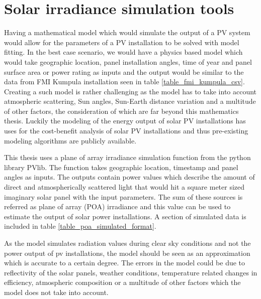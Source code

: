 \chapter{Solar irradiance simulation tools}
Having a mathematical model which would simulate the output of a PV system would allow for the parameters of a PV installation to be solved with model fitting. In the best case scenario, we would have a physics based model which would take geographic location, panel installation angles, time of year and panel surface area or power rating as inputs and the output would be similar to the data from FMI Kumpula installation seen in table \ref{table_fmi_kumpula_csv}. Creating a such model is rather challenging as the model has to take into account atmospheric scattering, Sun angles, Sun-Earth distance variation and a multitude of other factors, the consideration of which are far beyond this mathematics thesis. Luckily the modeling of the energy output of solar PV installations has uses for the cost-benefit analysis of solar PV installations and thus pre-existing modeling algorithms are publicly available. 



This thesis uses a plane of array irradiance simulation function from the python library PVlib. The function takes geographic location, timestamp and panel angles as inputs. The outputs contain power values which describe the amount of direct and atmospherically scattered light that would hit a square meter sized imaginary solar panel with the input parameters. The sum of these sources is referred as plane of array (POA) irradiance and this value can be used to estimate the output of solar power installations. A section of simulated data is included in table \ref{table_poa_simulated_format}.

As the model simulates radiation values during clear sky conditions and not the power output of pv installations, the model should be seen as an approximation which is accurate to a certain degree. The errors in the model could be due to reflectivity of the solar panels, weather conditions, temperature related changes in efficiency, atmospheric composition or a multitude of other factors which the model does not take into account.

